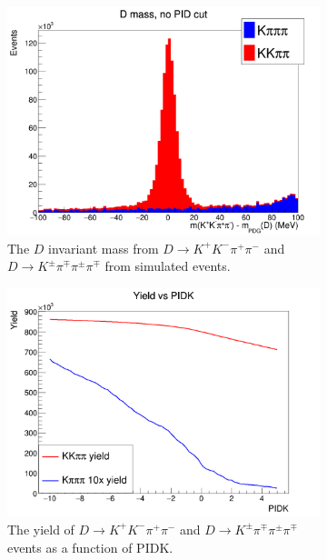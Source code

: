 \documentclass[12pt, a4paper, notitlepage, onecolumn]{article}
\numberwithin{equation}{section}
\begin{document}
\begin{figure}[H] 
  \centering
  \begin{subfigure}{0.5\textwidth}
    \centering
    \includegraphics[width=1\textwidth]{Plots/B2DK_Dmass_Background.png}
    \caption{The $D$ invariant mass from $D\to K^+K^-\pi^+\pi^-$ and $D\to K^\pm\pi^\mp\pi^\pm\pi^\mp$ from simulated events.}
    \label{fig_Dmass_kpipipi}
  \end{subfigure}%
  \begin{subfigure}{0.5\textwidth}
    \centering
    \includegraphics[width=1\textwidth]{Plots/YieldVSPIDK.png}
    \caption{The yield of $D\to K^+K^-\pi^+\pi^-$ and $D\to K^\pm\pi^\mp\pi^\pm\pi^\mp$ events as a function of $\text{PIDK}$.}
    \label{fig_yield_kpipipi}
  \end{subfigure}
  \caption{}
\end{figure}
\end{document}
